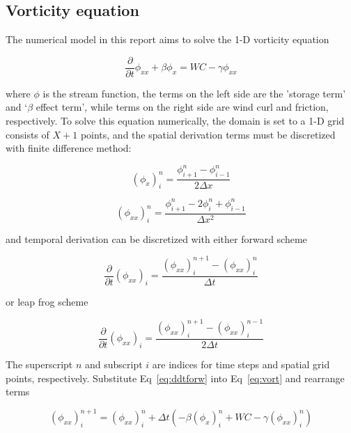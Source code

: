 \documentclass[12pt]{article}
\begin{document}
\subsection{Vorticity equation}

The numerical model in this report aims to solve the 1-D vorticity equation

\begin{equation}
\frac{\partial}{\partial t}\phi_{xx} + \beta\phi_x = WC - \gamma\phi_{xx}
\label{eq:vort}
\end{equation}
 
where $\phi$ is the stream function, the terms on the left side are the 'storage term' and `$\beta$ effect term', while terms on the right side are wind curl and friction, respectively. To solve this equation numerically, the domain is set to a 1-D grid consists of $X+1$ points, and the spatial derivation terms must be discretized with finite difference method:

\begin{equation}
(\phi_x)_i^n = \frac{\phi_{i+1}^n-\phi_{i-1}^n}{2\Delta x}
\label{eq:ddx}
\end{equation}

\begin{equation}
(\phi_{xx})_i^n = \frac{\phi_{i+1}^n-2\phi_i^n+\phi_{i-1}^n}{\Delta x^2}
\label{eq:ddxx}
\end{equation}

and temporal derivation can be discretized with either forward scheme

\begin{equation}
\frac{\partial}{\partial t}(\phi_{xx})_i = \frac{(\phi_{xx})_i^{n+1}-(\phi_{xx})_i^n}{\Delta t}
\label{eq:ddtforw}
\end{equation}

or leap frog scheme

\begin{equation}
\frac{\partial}{\partial t}(\phi_{xx})_i = \frac{(\phi_{xx})_i^{n+1}-(\phi_{xx})_i^{n-1}}{2\Delta t}
\label{eq:ddtlfrog}
\end{equation}

The superscript $n$ and subscript $i$ are indices for time steps and spatial grid points, respectively. Substitute Eq~\ref{eq:ddtforw} into Eq~\ref{eq:vort} and rearrange terms

\begin{equation}
(\phi_{xx})_i^{n+1} = (\phi_{xx})_i^n + \Delta t(-\beta(\phi_x)_i^n + WC - \gamma(\phi_{xx})_i^n)
\label{eq:vortdes}
\end{equation}
\end{document}
